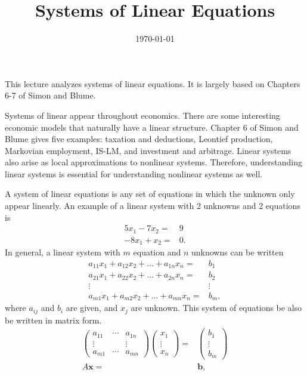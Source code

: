 \documentclass[12pt,reqno]{amsart}
\title{Systems of Linear Equations}
\date{\today}
\theoremstyle{definition}
\begin{document}
\maketitle

This lecture analyzes systems of linear equations. It is largely based
on Chapters 6-7 of Simon and Blume. 

Systems of linear appear throughout economics. There are some
interesting economic models that naturally have a linear
structure. Chapter 6 of Simon and Blume gives five examples: taxation
and deductions, Leontief production, Markovian employment, IS-LM, and
investment and arbitrage. Linear systems also arise as local
approximations to nonlinear systems. Therefore, understanding linear
systems is essential for understanding nonlinear systems as well.

A system of linear equations is any set of equations in which the
unknown only appear linearly. An example of a linear system with 2
unknowns and 2 equations is
\begin{align*}
  5 x_1 - 7 x_2 = & 9 \\
  -8 x_1 + x_2 = & 0.
\end{align*}
In general, a linear system with $m$ equation and $n$ unknowns can be
written
\begin{align*}
  a_{11} x_1 + a_{12} x_2 + ... + a_{1n} x_n = & b_1 \\
  a_{21} x_1 + a_{22} x_2 + ... + a_{2n} x_n = & b_2 \\
  \vdots & \vdots \\
  a_{m1} x_1 + a_{m2} x_2 + ... + a_{mn} x_n = & b_m ,
\end{align*}
where $a_{ij}$ and $b_i$ are given, and $x_j$ are unknown.  This
system of equations be also be written in matrix form.
\begin{align*}
  \begin{pmatrix} a_{11} &  \cdots & a_{1n} \\
    \vdots & & \vdots \\
    a_{m1} & \cdots & a_{mn} 
  \end{pmatrix} 
  \begin{pmatrix} x_1 \\ \vdots \\ x_n
  \end{pmatrix} = & \begin{pmatrix} b_1 \\ \vdots \\ b_m
  \end{pmatrix} \\
  A \mathbf{x} = & \mathbf{b},
\end{align*}
\end{document}
